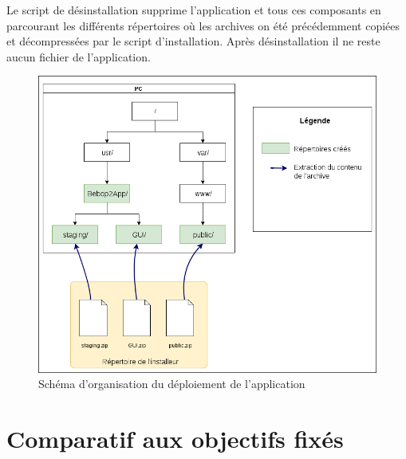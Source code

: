 \documentclass{article}
\begin{document}
Le script de désinstallation supprime l'application et tous ces composants en parcourant les différents répertoires où les archives on été précédemment copiées et décompressées par le script d'installation. Après désinstallation il ne reste aucun fichier de l'application.\\

	\begin{center}
	\begin{figure}[!h]
	\includegraphics[scale=0.6]{deploiement.png}
	\caption{Schéma d'organisation du déploiement de l'application}
	\end{figure}
    \end{center}
    
    
\newpage
\section{Comparatif aux objectifs fixés}
\end{document}
